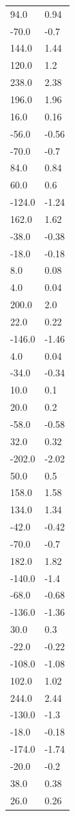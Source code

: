\begin{longtable}{ll}
94.0 & 0.94 \\
-70.0 & -0.7 \\
144.0 & 1.44 \\
120.0 & 1.2 \\
238.0 & 2.38 \\
196.0 & 1.96 \\
16.0 & 0.16 \\
-56.0 & -0.56 \\
-70.0 & -0.7 \\
84.0 & 0.84 \\
60.0 & 0.6 \\
-124.0 & -1.24 \\
162.0 & 1.62 \\
-38.0 & -0.38 \\
-18.0 & -0.18 \\
8.0 & 0.08 \\
4.0 & 0.04 \\
200.0 & 2.0 \\
22.0 & 0.22 \\
-146.0 & -1.46 \\
4.0 & 0.04 \\
-34.0 & -0.34 \\
10.0 & 0.1 \\
20.0 & 0.2 \\
-58.0 & -0.58 \\
32.0 & 0.32 \\
-202.0 & -2.02 \\
50.0 & 0.5 \\
158.0 & 1.58 \\
134.0 & 1.34 \\
-42.0 & -0.42 \\
-70.0 & -0.7 \\
182.0 & 1.82 \\
-140.0 & -1.4 \\
-68.0 & -0.68 \\
-136.0 & -1.36 \\
30.0 & 0.3 \\
-22.0 & -0.22 \\
-108.0 & -1.08 \\
102.0 & 1.02 \\
244.0 & 2.44 \\
-130.0 & -1.3 \\
-18.0 & -0.18 \\
-174.0 & -1.74 \\
-20.0 & -0.2 \\
38.0 & 0.38 \\
26.0 & 0.26 \\

\end{longtable}
